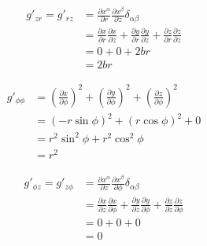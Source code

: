 \documentclass[12pt]{article}
\begin{document}
\begin{equation*}
      \begin{split}
            g'_{z r} = g'_{r z} & =
            \frac{\partial x^\alpha}{\partial r} \frac{\partial x^\beta}{\partial z} \delta_{\alpha\beta}                                                                                                                   \\
                                & = \frac{\partial x}{\partial r} \frac{\partial x}{\partial z} + \frac{\partial y}{\partial r} \frac{\partial y}{\partial z} + \frac{\partial z}{\partial r} \frac{\partial z}{\partial z} \\
                                & = 0 + 0 + 2br                                                                                                                                                                             \\
                                & = 2br
      \end{split}
\end{equation*}

\begin{equation*}
      \begin{split}
            g'_{\phi \phi} & = {\left(\frac{\partial x}{\partial \phi} \right)}^2 +
            {\left(\frac{\partial y}{\partial \phi} \right)}^2 +
            {\left(\frac{\partial z}{\partial \phi} \right)}^2                      \\
                           & = (-r\sin\phi)^2 + (r\cos\phi)^2 + 0                   \\
                           & = r^2\sin^2\phi + r^2\cos^2\phi                        \\
                           & = r^2
      \end{split}
\end{equation*}

\begin{equation*}
      \begin{split}
            g'_{\phi z} = g'_{z \phi} & =
            \frac{\partial x^\alpha}{\partial z} \frac{\partial x^\beta}{\partial \phi} \delta_{\alpha\beta}                                                                                                                               \\
                                      & = \frac{\partial x}{\partial z} \frac{\partial x}{\partial \phi} + \frac{\partial y}{\partial z} \frac{\partial y}{\partial \phi} + \frac{\partial z}{\partial z} \frac{\partial z}{\partial \phi} \\
                                      & = 0 + 0 + 0                                                                                                                                                                                        \\
                                      & = 0
      \end{split}
\end{equation*}
\end{document}
